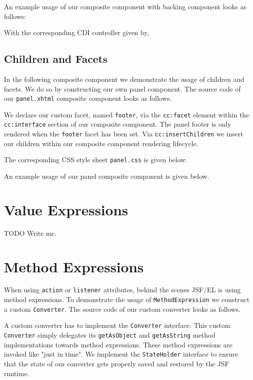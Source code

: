 An example usage of our composite component with backing component looks as follows:

With the corresponding CDI controller given by,


\subsection{Children and Facets}
In the following composite component we demonstrate the usage of children and facets.
We do so by constructing our own panel component.
The source code of our \texttt{panel.xhtml} composite component looks as follows.

We declare our custom facet, named \texttt{footer},
via the \texttt{cc:facet} element within the \texttt{cc:interface} section of our composite component.
The panel footer is only rendered when the \texttt{footer} facet has been set.
Via \texttt{cc:insertChildren} we insert our children within our composite component rendering lifecycle.

The corresponding CSS style sheet \texttt{panel.css} is given below.


An example usage of our panel composite component is given below.


\section{Value Expressions}
\begin{TODO}{TODO}
	Write me.
\end{TODO}

\section{Method Expressions}
When using \texttt{action} or \texttt{listener} attributes, behind the scenes JSF/EL is using method expressions.
To demonstrate the usage of \texttt{MethodExpression} we construct a custom \texttt{Converter}.
The source code of our custom converter looks as follows.

A custom converter has to implement the \texttt{Converter} interface.
This custom \texttt{Converter} simply delegates its \texttt{getAsObject} and \texttt{getAsString} method implementations towards method expressions.
These method expressions are invoked like "just in time".
We implement the \texttt{StateHolder} interface to ensure that the state of our converter gets properly saved and restored by the JSF runtime.

